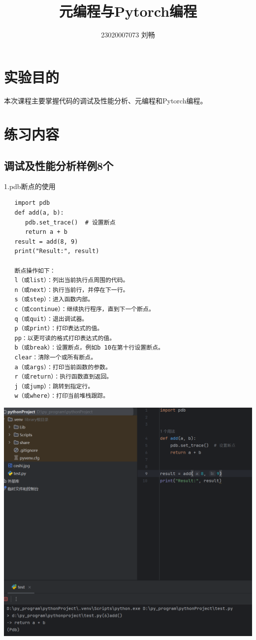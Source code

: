 \documentclass{article}
\title{元编程与Pytorch编程}
\author{23020007073  刘畅}
\begin{document}
\maketitle

\section{实验目的}
本次课程主要掌握代码的调试及性能分析、元编程和Pytorch编程。

\section{练习内容}
\subsection{调试及性能分析样例8个}




1.pdb断点的使用
\begin{verbatim}
   import pdb
   def add(a, b):
      pdb.set_trace()  # 设置断点
      return a + b
   result = add(8, 9)
   print("Result:", result)
  
   断点操作如下：
   l（或list）：列出当前执行点周围的代码。
   n（或next）：执行当前行，并停在下一行。
   s（或step）：进入函数内部。
   c（或continue）：继续执行程序，直到下一个断点。
   q（或quit）：退出调试器。
   p（或print）：打印表达式的值。
   pp：以更可读的格式打印表达式的值。
   b（或break）：设置断点，例如b 10在第十行设置断点。
   clear：清除一个或所有断点。
   a（或args）：打印当前函数的参数。
   r（或return）：执行函数直到返回。
   j（或jump）：跳转到指定行。
   w（或where）：打印当前堆栈跟踪。
 \end{verbatim}


\noindent
\begin{minipage}{\linewidth}
  \centering
  \includegraphics[width=0.5\linewidth]{duandian.png}
  \label{fig:example}
\end{minipage}
\end{document}
